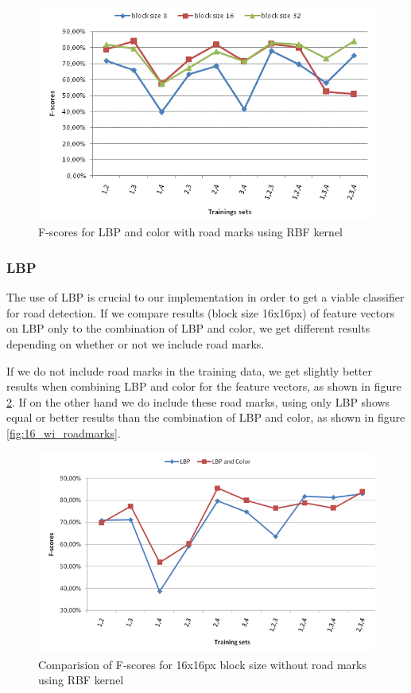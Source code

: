 \documentclass[runningheads,a4paper]{llncs}
\begin{document}
\begin{figure}
\centering
\includegraphics[width=\textwidth]{fig/RBF_LBP_Col_wi_RM.png}
\caption{F-scores for LBP and color with road marks using RBF kernel}
\label{fig:lbp-col-wi-rm}
\end{figure}

\subsubsection{LBP}
The use of LBP is crucial to our implementation in order to get a viable classifier for road detection. If we compare results (block size 16x16px) of feature vectors on LBP only to the combination of LBP and color, we get different results depending on whether or not we include road marks. 

If we do not include road marks in the training data, we get slightly better results when combining LBP and color for the feature vectors, as shown in figure \ref{fig:16_wo_roadmarks}.
If on the other hand we do include these road marks, using only LBP shows equal or better results than the combination of LBP and color, as shown in figure \ref{fig:16_wi_roadmarks}. 

\begin{figure}[h]
\centering
\includegraphics[width=\textwidth]{fig/16_wo_roadmarks.png}
\caption{Comparision of F-scores for 16x16px block size without road marks using RBF kernel }
\label{fig:16_wo_roadmarks}
\end{figure}
\end{document}
